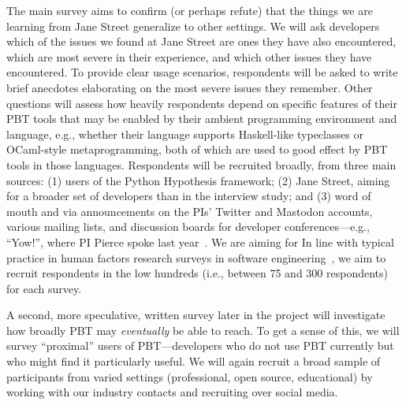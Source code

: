 The main survey
aims to confirm (or perhaps refute) that
the things we are learning from Jane Street generalize to other settings.
We will
ask developers which of the issues we found at Jane Street are
ones they have also encountered, which are most severe
in their experience, and which
other issues they have encountered.
To provide
clear usage scenarios, respondents will
be asked to write brief anecdotes elaborating on the
most severe issues they remember.  Other questions will assess how
heavily respondents depend on specific features of their PBT tools
that may be enabled by their
ambient programming environment and language, e.g., whether their
language supports Haskell-like typeclasses or OCaml-style
metaprogramming, both of which are used to good effect by
PBT tools in those languages. 
Respondents will
be recruited broadly, from three main sources: (1)
users of the Python Hypothesis framework; (2) Jane Street, aiming for
a broader set of developers than in the interview study; and (3)
word of mouth and via announcements on the PIs' Twitter and Mastodon
accounts, various mailing lists, and discussion boards for developer
conferences---e.g., ``Yow!'', where PI Pierce spoke last
year~\cite{Pierce:Yow22}. We are aiming for    
In line with typical practice in 
human factors research surveys in software
engineering~\cite{ref:robillard2009makes,ref:uddin2015api,ref:murphyhill2019predicts},
we aim to recruit respondents in the low hundreds (i.e., between 75 and 300
respondents) for each survey.

A second, more speculative, written survey later in the project will investigate
how broadly PBT may {\em eventually} be able to reach.  To get a sense
of this, we will
survey ``proximal'' users of PBT---developers who do not use PBT
currently but who might find it particularly
useful.
We
will again recruit a broad sample of participants from varied settings
(professional, open source, educational) by working with our industry contacts
and recruiting over social media.
%
\iflater {}  \fi

